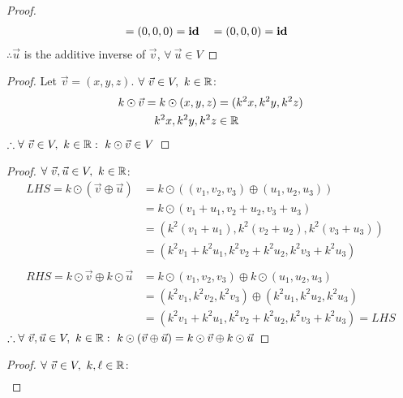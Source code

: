 \documentclass{article}
\begin{document}
\begin{enumerate}
\begin{proof}
\begin{align*}
                                   & = (0,0,0) = \operatorname{\textbf{id}}                         &                        & = (0,0,0) = \operatorname{\textbf{id}}
        \end{align*}
        $\therefore \vec{u}$ is the additive inverse of $\vec{v}$, $\forall~\vec{u} \in V$
    \end{proof}
    \begin{proof}
        Let $\vec{v}=(x,y,z)$. $\forall~\vec{v} \in V,~k \in \mathbb{R}$:
        \begin{align*}
            k \odot \vec{v} = k \odot (x,y,z) & = (k^2x,k^2y,k^2z) \\
            k^2x,k^2y,k^2z                    & \in \mathbb{R}
        \end{align*}
        $\therefore \forall~\vec{v} \in V,~k \in \mathbb{R}:~k \odot \vec{v} \in V$
    \end{proof}
    \begin{proof}
        $\forall~\vec{v},\vec{u} \in V,~k \in \mathbb{R}$:
        \begin{align*}
            LHS = k \odot (\vec{v} \oplus \vec{u})       & = k \odot ((v_1,v_2,v_3) \oplus (u_1,u_2,u_3))         \\
                                                         & = k \odot (v_1+u_1,v_2+u_2,v_3+u_3)                    \\
                                                         & = (k^2(v_1+u_1), k^2(v_2+u_2), k^2(v_3+u_3))           \\
                                                         & = (k^2v_1+k^2u_1,k^2v_2+k^2u_2,k^2v_3+k^2u_3)          \\ \\
            RHS = k \odot \vec{v} \oplus k \odot \vec{u} & = k \odot (v_1,v_2,v_3) \oplus k \odot (u_1,u_2,u_3)   \\
                                                         & = (k^2v_1,k^2v_2,k^2v_3) \oplus (k^2u_1,k^2u_2,k^2u_3) \\
                                                         & = (k^2v_1+k^2u_1,k^2v_2+k^2u_2,k^2v_3+k^2u_3) = LHS
        \end{align*}
        $\therefore \forall~\vec{v},\vec{u} \in V,~k \in \mathbb{R}:~k \odot (\vec{v} \oplus \vec{u}) = k \odot \vec{v} \oplus k \odot \vec{u}$
    \end{proof}
    \begin{proof}
        $\forall~\vec{v} \in V,~k,\ell \in \mathbb{R}$:
        \begin{align*}

\end{align*}
\end{proof}
\end{enumerate}
\end{document}
